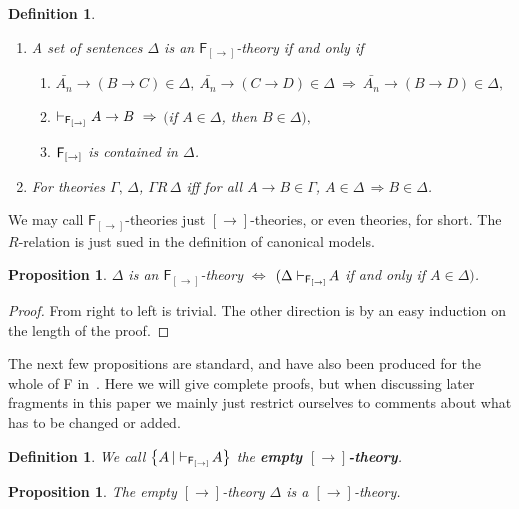\documentclass[12pt]{article}
\newtheorem{prop}[thm]{Proposition}
\newtheorem{dfn}[thm]{Definition}
\begin{document}
\begin{dfn}\label{r1}
\begin{enumerate}
\item  A set of sentences $ \Delta$ is an $\mathsf{F_{[\rightarrow]} }$-theory if and only if
\begin{enumerate}
\item   $\bar{A_{n}}\rightarrow (B\rightarrow C) \in \Delta, ~\bar{A_{n}}\rightarrow (C\rightarrow D) \in \Delta ~\Rightarrow~ \bar{A_{n}}\rightarrow (B\rightarrow D) \in \Delta, $

\item  $ \vdash_{\sf F_{[\rightarrow]}}A\rightarrow B ~\Rightarrow$  $($if $ A \in \Delta$, then $ B \in \Delta), $

\item ${\sf F_{[\rightarrow]}}$ is contained in $ \Delta $.
\end{enumerate}
\item  For theories $\Gamma,\,\Delta$, $ \Gamma R\,\Delta$ iff for all $A\rightarrow B \in \Gamma$, $A\in \Delta\,\Rightarrow B \in \Delta$.
\end{enumerate}
\end{dfn}

We may call $\mathsf{F_{[\rightarrow]} }$-theories just $[\rightarrow]$-theories, or even theories, for short. The $R$-relation is just sued in the definition of canonical models.

\begin{prop}
$ \Delta $ is an $\mathsf{F_{[\rightarrow]} }$-theory  $ \Longleftrightarrow $ $( \Delta\vdash_{{\sf F_{[\rightarrow]}} }\!A $ if and only if $ A \in \Delta)$.
\end{prop}
\begin{proof}
From right to left is trivial. The other direction is by an easy induction on the length of the proof.
\end{proof}The next few propositions are standard, and have also been produced for the whole of {\sf F} in~\cite{Dic}. Here we will give complete proofs, but when discussing later fragments in this paper we mainly just restrict ourselves to comments about what has to be changed or added.

\begin{dfn}\label{r2}
We call $ \left\lbrace  A\,|\vdash_{{\sf F_{[\rightarrow]}} }\!A\right\rbrace$ the \textbf{empty $ {[\rightarrow]} $-theory}.
\end{dfn}
\begin{prop}\label{empty}
The empty $ {[\rightarrow]} $-theory $\Delta$ is a $ {[\rightarrow]} $-theory.
\end{prop}
\end{document}
